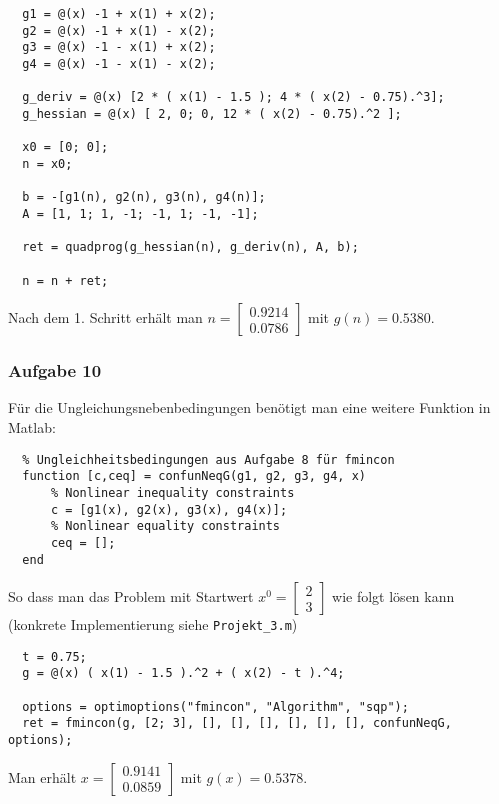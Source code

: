 \documentclass[a4paper, 12pt]{report}
\begin{document}
\begin{lstlisting}
  g1 = @(x) -1 + x(1) + x(2);
  g2 = @(x) -1 + x(1) - x(2);
  g3 = @(x) -1 - x(1) + x(2);
  g4 = @(x) -1 - x(1) - x(2);

  g_deriv = @(x) [2 * ( x(1) - 1.5 ); 4 * ( x(2) - 0.75).^3];
  g_hessian = @(x) [ 2, 0; 0, 12 * ( x(2) - 0.75).^2 ];
  
  x0 = [0; 0];
  n = x0;
  
  b = -[g1(n), g2(n), g3(n), g4(n)];
  A = [1, 1; 1, -1; -1, 1; -1, -1];

  ret = quadprog(g_hessian(n), g_deriv(n), A, b);
  
  n = n + ret;\end{lstlisting}

Nach dem 1. Schritt erhält man $n = \begin{bmatrix}0.9214\\0.0786\end{bmatrix}$ mit $g(n) = 0.5380$.

\subsubsection{Aufgabe 10}

Für die Ungleichungsnebenbedingungen benötigt man eine weitere Funktion in Matlab:

\begin{lstlisting}
  % Ungleichheitsbedingungen aus Aufgabe 8 für fmincon
  function [c,ceq] = confunNeqG(g1, g2, g3, g4, x)
      % Nonlinear inequality constraints
      c = [g1(x), g2(x), g3(x), g4(x)];
      % Nonlinear equality constraints
      ceq = [];
  end\end{lstlisting}

So dass man das Problem mit Startwert $x^0 = \begin{bmatrix}2\\3\end{bmatrix}$ wie folgt lösen kann
(konkrete Implementierung siehe \lstinline[basicstyle=\ttfamily\color{black}]|Projekt_3.m|)

\begin{lstlisting}
  t = 0.75;
  g = @(x) ( x(1) - 1.5 ).^2 + ( x(2) - t ).^4;

  options = optimoptions("fmincon", "Algorithm", "sqp");
  ret = fmincon(g, [2; 3], [], [], [], [], [], [], confunNeqG, options);\end{lstlisting}

Man erhält $x = \begin{bmatrix}0.9141\\0.0859\end{bmatrix}$ mit $g(x)=0.5378$.
\end{document}
